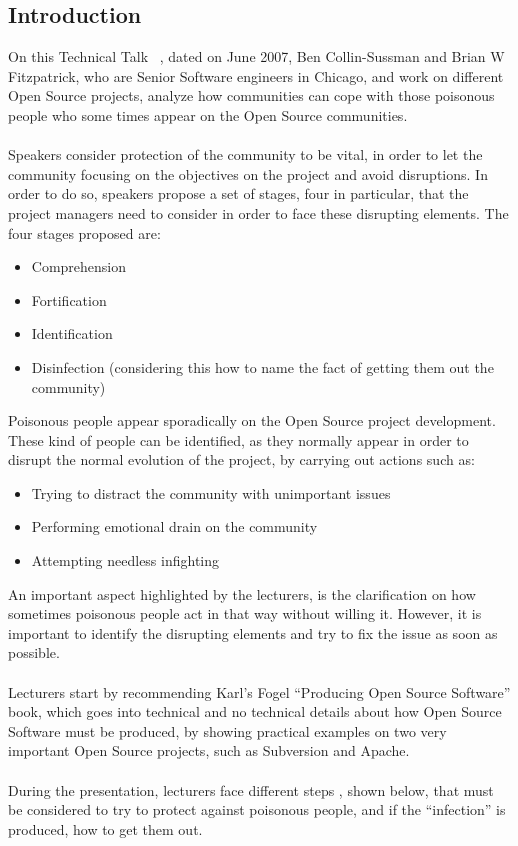 \documentclass[11pt]{article}
\begin{document}
\subsection{Introduction}
On this Technical Talk ~\cite{TALK01}, dated on June 2007, Ben Collin-Sussman and Brian W Fitzpatrick, who are Senior Software engineers in Chicago, and work on different Open Source projects, analyze how communities can cope with those poisonous people who some times appear on the Open Source communities.\\
\\
Speakers consider protection of the community to be vital, in order to let the community focusing on the objectives on the project and avoid disruptions.
In order to do so, speakers propose a set of stages, four in particular, that the project managers need to consider in order to face these disrupting elements. The four stages proposed are:
\begin{itemize}\itemsep0pt
\item{Comprehension}
\item{Fortification}
\item{Identification}
\item{Disinfection (considering this how to name the fact of getting them out the community)}
\end{itemize}
Poisonous people appear sporadically on the Open Source project development. These kind of people can be identified, as they normally appear in order to disrupt the normal evolution of the project, by carrying out actions such as:
\begin{itemize}\itemsep0pt
\item{Trying to distract the community with unimportant issues}
\item{Performing emotional drain on the community}
\item{Attempting needless infighting}
\end{itemize}
An important aspect highlighted by the lecturers, is the clarification on how sometimes poisonous people act in that way without willing it. However, it is important to identify the disrupting elements and try to fix the issue as soon as possible.\\
\\
Lecturers start by recommending Karl's Fogel ``Producing Open Source Software'' book, which goes into technical and no technical details about how Open Source Software must be produced, by showing practical examples on two very important Open Source projects, such as Subversion and Apache.\\
\\
During the presentation, lecturers face different steps , shown below, that must be considered to try to protect against poisonous people, and if the ``infection'' is produced, how to get them out.\\
\end{document}
